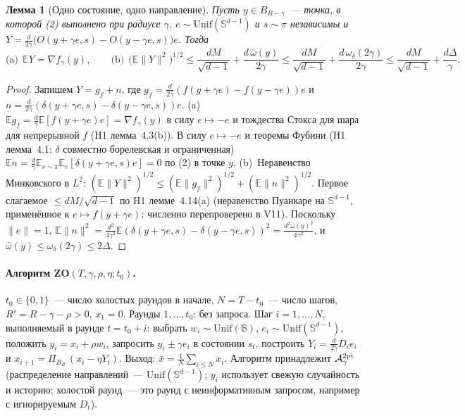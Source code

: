 \documentclass[11pt,a4paper]{article}
\numberwithin{equation}{section}
\newtheorem{lemma}[theorem]{Лемма}
\theoremstyle{definition}
\theoremstyle{remark}
\newcommand{\E}{\mathbb E}\newcommand{\R}{\mathbb R}\newcommand{\Z}{\mathbb Z}\let\Prob\relax\newcommand{\Prob}{\mathbb P}
\newcommand{\norm}[1]{\lVert #1\rVert}\newcommand{\abs}[1]{\lvert #1\rvert}\newcommand{\ip}[2]{\langle #1,#2\rangle}
\newcommand{\Unif}{\mathrm{Unif}}\newcommand{\TV}{\mathrm{TV}}\newcommand{\BC}{\mathrm{BC}}\newcommand{\tmix}{t_{\rm mix}}
\newcommand{\Sph}{\mathbb S^{d-1}}\newcommand{\Ball}{\mathbb B}\newcommand{\iid}{\mathrm{iid}}
\newcommand{\wbar}{\bar\omega}\newcommand{\Atwo}{\cA^{\rm 2pt}_\gamma}
\begin{document}
\begin{lemma}[Одно состояние, одно направление]\label{lem:mom}
Пусть $y\in B_{R-\gamma}$~--- точка, в которой (2) выполнено при радиусе $\gamma$, $e\sim\Unif(\Sph)$ и $s\sim\pi$ независимы и $Y=\frac d{2\gamma}\big(O(y+\gamma e,s)-O(y-\gamma e,s)\big)e$. Тогда
\[
\text{(a)}\ \ \E Y=\nabla f_\gamma(y),\qquad\text{(b)}\ \ \big(\E\norm Y^2\big)^{1/2}\le\frac{dM}{\sqrt{d-1}}+\frac{d\,\wbar(y)}{2\gamma}\le\frac{dM}{\sqrt{d-1}}+\frac{d\,\omega_\delta(2\gamma)}{2\gamma}\le \frac{dM}{\sqrt{d-1}}+\frac{d\Delta}{\gamma}.
\]
\end{lemma}
\begin{proof}
Запишем $Y=g_f+n$, где $g_f=\frac d{2\gamma}(f(y+\gamma e)-f(y-\gamma e))e$ и $n=\frac d{2\gamma}(\delta(y+\gamma e,s)-\delta(y-\gamma e,s))e$.
(a)~$\E g_f=\frac d\gamma\E[f(y+\gamma e)e]=\nabla f_\gamma(y)$ в силу $e\mapsto-e$ и тождества Стокса для шара для непрерывной $f$ (H1 лемма~4.3(b)). В силу $e\mapsto-e$ и теоремы Фубини (H1 лемма~4.1; $\delta$ совместно борелевская и ограниченная) $\E n=\frac d\gamma\E_{s\sim\pi}\E_e[\delta(y+\gamma e,s)e]=0$ по (2) в точке $y$.
(b)~Неравенство Минковского в $L^2$: $(\E\norm Y^2)^{1/2}\le(\E\norm{g_f}^2)^{1/2}+(\E\norm n^2)^{1/2}$. Первое слагаемое $\le dM/\sqrt{d-1}$ по H1 лемме~4.14(a) (неравенство Пуанкаре на $\Sph$, применённое к $e\mapsto f(y+\gamma e)$; численно перепроверено в V11). Поскольку $\norm e=1$, $\E\norm n^2=\frac{d^2}{4\gamma^2}\E(\delta(y+\gamma e,s)-\delta(y-\gamma e,s))^2=\frac{d^2\wbar(y)^2}{4\gamma^2}$, и $\wbar(y)\le\omega_\delta(2\gamma)\le2\Delta$.
\end{proof}

\paragraph{Алгоритм ZO$(T,\gamma,\rho,\eta;t_0)$.} $t_0\in\{0,1\}$~--- число холостых раундов в начале, $N=T-t_0$~--- число шагов, $R'=R-\gamma-\rho>0$, $x_1=0$. Раунды $1,\dots,t_0$: без запроса. Шаг $i=1,\dots,N$, выполняемый в раунде $t=t_0+i$: выбрать $w_i\sim\Unif(\Ball)$, $e_i\sim\Unif(\Sph)$, положить $y_i=x_i+\rho w_i$, запросить $y_i\pm\gamma e_i$ в состоянии $s_t$, построить $Y_i=\frac d{2\gamma}D_ie_i$ и $x_{i+1}=\Pi_{B_{R'}}(x_i-\eta Y_i)$. Выход: $\bar x=\frac1N\sum_{i\le N}x_i$. Алгоритм принадлежит $\Atwo$ (распределение направлений~--- $\Unif(\Sph)$; $y_i$ использует свежую случайность и историю; холостой раунд~--- это раунд с неинформативным запросом, например с игнорируемым $D_t$).
\end{document}
